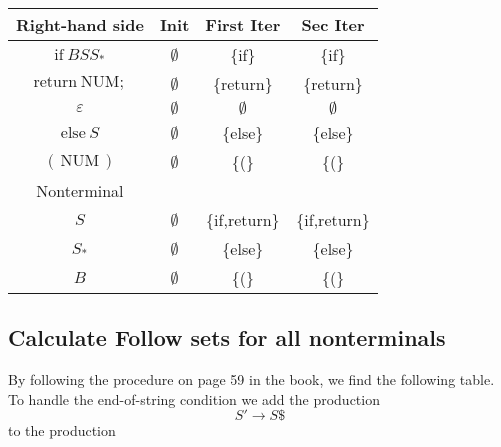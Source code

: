 \documentclass[11pt,a4paper]{article}
\begin{document}
\begin{center}
\begin{tabular}{c||c|c|c}
Right-hand side & Init & First Iter & Sec Iter\tabularnewline
\hline 
\hline 
$\mathrm{if\:}BSS_*$       & $\emptyset$ & \{if\}        & \{if\}        \tabularnewline
\hline                                                                
$\mathrm{return\:NUM;}$ & $\emptyset$ & \{return\}    & \{return\}    \tabularnewline
\hline                                                                
$\varepsilon$           & $\emptyset$ & $\emptyset$   & $\emptyset$   \tabularnewline
\hline                                                                
$\mathrm{else}\:S$      & $\emptyset$ & \{else\}      & \{else\}      \tabularnewline
\hline                                                                
$\mathrm{(\,NUM\,)}$    & $\emptyset$ & \{(\}         & \{(\}         \tabularnewline
\hline 
Nonterminal & \multicolumn{1}{c}{} & \multicolumn{1}{c}{} & \tabularnewline
\hline 
$S$                     & $\emptyset$ & \{if,return\} & \{if,return\} \tabularnewline
\hline                                                                  
$S_*$                   & $\emptyset$ & \{else\}      & \{else\}      \tabularnewline
\hline                                                                 
$B$                     & $\emptyset$ & \{(\}         & \{(\}         \tabularnewline
\end{tabular}               
\end{center}                

\subsection{Calculate Follow sets for all nonterminals}
By following the procedure on page 59 in the book, we find the following
table. To handle the end-of-string condition we add the production
$$S'\rightarrow S\$$$
to the production
\end{document}
